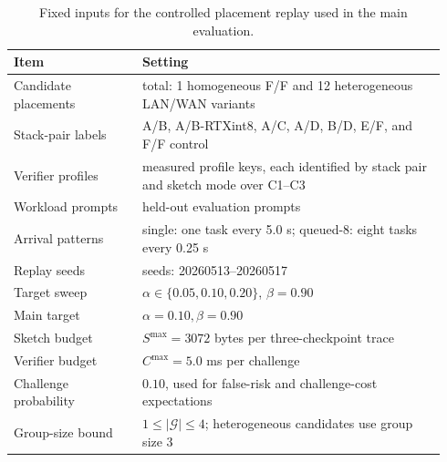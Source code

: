 \documentclass[sigplan,screen,review,anonymous]{acmart}
\begin{document}
\begin{table}[t]
\centering
\scriptsize
\setlength{\tabcolsep}{4.2pt}
\caption{Fixed inputs for the controlled placement replay used in the main
evaluation.}
\label{tab:app-placement-replay-config}
\begin{tabular}{@{}>{\raggedright\arraybackslash}p{0.28\linewidth}
                >{\raggedright\arraybackslash}p{0.66\linewidth}@{}}
\toprule
Item & Setting \\
\midrule
Candidate placements & 13 total: 1 homogeneous F/F and 12 heterogeneous LAN/WAN variants \\
Stack-pair labels & A/B, A/B-RTXint8, A/C, A/D, B/D, E/F, and F/F control \\
Verifier profiles & 34 measured profile keys, each identified by stack pair and sketch mode over C1--C3 \\
Workload prompts & 200 held-out evaluation prompts \\
Arrival patterns & single: one task every 5.0 s; queued-8: eight tasks every 0.25 s \\
Replay seeds & 5 seeds: 20260513--20260517 \\
Target sweep & \(\alpha\in\{0.05,0.10,0.20\}\), \(\beta=0.90\) \\
Main target & \(\alpha=0.10,\beta=0.90\) \\
Sketch budget & \(S^{\max}=3072\) bytes per three-checkpoint trace \\
Verifier budget & \(C^{\max}=5.0\) ms per challenge \\
Challenge probability & \(0.10\), used for false-risk and challenge-cost expectations \\
Group-size bound & \(1\le |\mathcal{G}|\le 4\); heterogeneous candidates use group size 3 \\
\bottomrule
\end{tabular}
\end{table}
\end{document}

